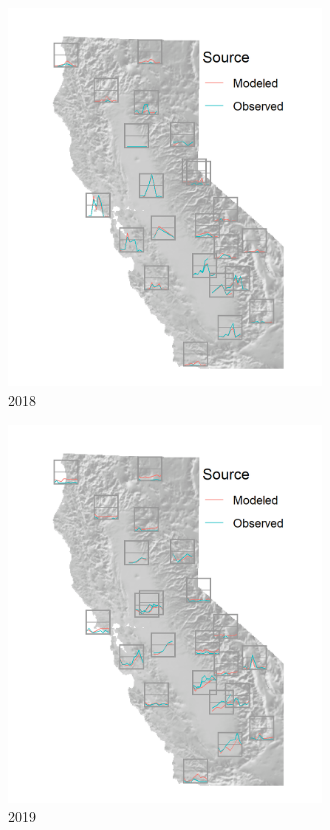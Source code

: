 \documentclass[gmd, manuscript]{copernicus}
\begin{document}
\begin{figure}
\includegraphics[width=8.3cm]{./Figures/Spark2018_GMD} \caption{2018}\label{fig:unnamed-chunk-6}
\end{figure}

\begin{figure}
\includegraphics[width=8.3cm]{./Figures/Spark2019_GMD} \caption{2019}\label{fig:unnamed-chunk-7}
\end{figure}
\end{document}
